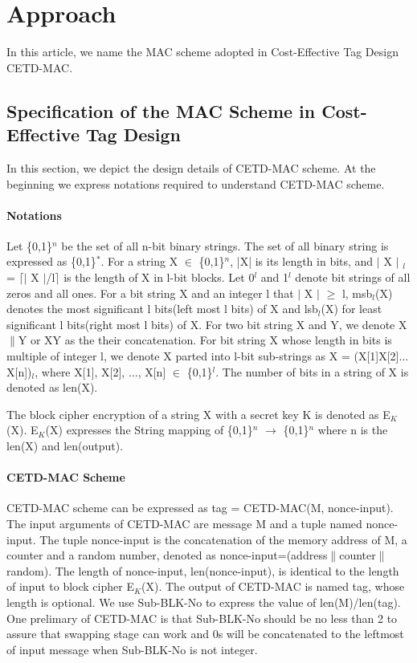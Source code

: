 \documentclass{article}
\begin{document}
\section{Approach}
In this article, we name the MAC scheme adopted in Cost-Effective Tag Design\cite{} CETD-MAC. 
\subsection{Specification of the MAC Scheme in Cost-Effective Tag Design}
In this section, we depict the design details of CETD-MAC scheme. At the beginning we express notations required to understand CETD-MAC scheme. 

\paragraph{Notations}
Let \{0,1\}$^n$ be the set of all n-bit binary strings. The set of all binary string is expressed as \{0,1\}$^*$.  
For a string X $\in$ \{0,1\}$^n$, |X| is its length in bits, and $\vert$ X $\vert$ $_l$ = $\lceil$$\vert$ X $\vert$/l$\rceil$ is the length of X in l-bit blocks.  Let 0$^l$ and 1$^l$ denote bit strings of all zeros and all ones. 
For a bit string X and an integer l that $\vert$ X $\vert$ $\geq$ l, msb$_l$(X) denotes the most significant l bits(left most l bits) of X and lsb$_l$(X) for least significant l bits(right most l bits) of X.
For two bit string X and Y, we denote X$\|$Y  or XY as the their concatenation. For bit string X whose length in bits is multiple of integer l, we denote X parted into l-bit sub-strings as X = (X[1]X[2]$\ldots$X[n])$_l$, where X[1], X[2], $\ldots$, X[n] $\in$ \{0,1\}$^l$.
The number of bits in a string of X is denoted as len(X).

The block cipher encryption of a string X with a secret key K is denoted as E$_K$(X). E$_K$(X) expresses the String mapping of \{0,1\}$^n$ $\rightarrow$ \{0,1\}$^n$ where n is the len(X) and len(output).
\paragraph{CETD-MAC Scheme}
CETD-MAC scheme can be expressed as tag = CETD-MAC(M, nonce-input). The input arguments of CETD-MAC are message M and a tuple named nonce-input. The tuple nonce-input is the concatenation of the memory address of M, a counter and a random number, denoted as nonce-input=(address$\|$counter$\|$random). The length of nonce-input, len(nonce-input), is identical to the length of input to block cipher E$_K$(X). The output of CETD-MAC is named tag, whose length is optional. We use Sub-BLK-No to express the value of  len(M)/len(tag). One prelimary of CETD-MAC is that Sub-BLK-No should be no less than 2 to assure that swapping stage can work and 0s will be concatenated to the leftmost of input message when Sub-BLK-No is not integer.  
\end{document}
